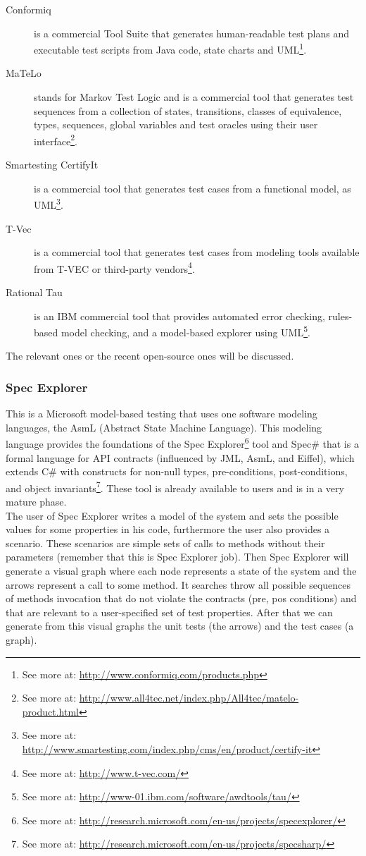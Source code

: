 \documentclass[a4paper,UKenglish]{oasics}
\begin{document}
\begin{description}
\item[Conformiq] is a commercial Tool Suite that generates
human-readable test plans and executable test scripts from Java code, state charts and UML\footnote{See more at: \url{http://www.conformiq.com/products.php}}.
\item[MaTeLo] stands for Markov Test Logic and is a commercial tool
that generates test sequences from a collection of states, transitions, classes of equivalence, types, sequences, global variables and test oracles
using their user interface\footnote{See more at: \url{http://www.all4tec.net/index.php/All4tec/matelo-product.html}}.
\item[Smartesting CertifyIt] is a commercial tool that generates test cases from a functional model, as UML\footnote{See more at: \url{http://www.smartesting.com/index.php/cms/en/product/certify-it}}.
\item[T-Vec] is a commercial tool that generates test cases from modeling tools available from T-VEC or third-party vendors\footnote{See more at: \url{http://www.t-vec.com/}}.
\item[Rational Tau] is an IBM commercial tool that provides automated error checking, rules-based model checking, and a model-based explorer using
UML\footnote{See more at: \url{http://www-01.ibm.com/software/awdtools/tau/}}.
\end{description}
The relevant ones or the recent open-source ones will be discussed.

\subsubsection{Spec Explorer}
This is a Microsoft model-based testing that uses one software modeling languages, the AsmL (Abstract State Machine Language).
This modeling language provides the foundations of the Spec Explorer\footnote{See more at: \url{http://research.microsoft.com/en-us/projects/specexplorer/}} tool
and Spec\# that is a formal language for API contracts (influenced by JML, AsmL, and Eiffel), which extends C\# with constructs for non-null types,
pre-conditions, post-conditions, and object invariants\footnote{See more at: \url{http://research.microsoft.com/en-us/projects/specsharp/}}.
These tool is already available to users and is in a very mature phase.\\
\indent The user of Spec Explorer writes a model of the system and sets the possible values for some properties in his code, furthermore the user also provides a scenario.
These scenarios are simple sets of calls to methods without their parameters (remember that this is Spec Explorer job).
Then Spec Explorer will generate a visual graph where each node represents a state of the system and the arrows represent a call to some method.
It searches throw all possible sequences of methods invocation that do not violate the contracts (pre, pos conditions) and
that are relevant to a user-specified set of test properties. After that we can generate from this visual graphs the unit tests (the arrows) and the
test cases (a graph).
\end{document}

